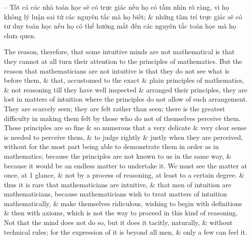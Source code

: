 \documentclass{article}
\begin{document}
\begin{enumerate}
\begin{itemize}
		-- Tất cả các nhà toán học sẽ có trực giác nếu họ có tầm nhìn rõ ràng, vì họ không lý luận sai từ các nguyên tắc mà họ biết; \& những tâm trí trực giác sẽ có tư duy toán học nếu họ có thể hướng mắt đến các nguyên tắc toán học mà họ chưa quen.
		
		The reason, therefore, that some intuitive minds are not mathematical is that they cannot at all turn their attention to the principles of mathematics. But the reason that mathematicians are not intuitive is that they do not see what is before them, \& that, accustomed to the exact \& plain principles of mathematics, \& not reasoning till they have well inspected \& arranged their principles, they are lost in matters of intuition where the principles do not allow of such arrangement. They are scarcely seen; they are felt rather than seen; there is the greatest difficulty in making them felt by those who do not of themselves perceive them. These principles are so fine \& so numerous that a very delicate \& very clear sense is needed to perceive them, \& to judge rightly \& justly when they are perceived, without for the most part being able to demonstrate them in order as in mathematics; because the principles are not known to us in the same way, \& because it would be an endless matter to undertake it. We must see the matter at once, at 1 glance, \& not by a process of reasoning, at least to a certain degree. \& thus it is rare that mathematicians are intuitive, \& that men of intuition are mathematicians, because mathematicians wish to treat matters of intuition mathematically, \& make themselves ridiculous, wishing to begin with definitions \& then with axioms, which is not the way to proceed in this kind of reasoning. Not that the mind does not do so, but it does it tacitly, naturally, \& without technical rules; for the expression of it is beyond all men, \& only a few can feel it.
		

\end{itemize}
\end{enumerate}
\end{document}
